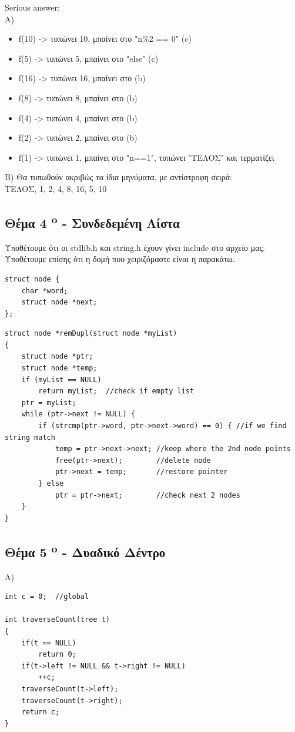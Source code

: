 \documentclass[a4paper,10pt]{article}
\begin{document}
Serious answer:\\
A)
\begin{itemize}
    \item f(10) -> τυπώνει 10, μπαίνει στο "n\%2 == 0" (c)
    \item f(5)  -> τυπώνει 5,  μπαίνει στο "else" (c)
    \item f(16) -> τυπώνει 16,  μπαίνει στο (b)
    \item f(8)  -> τυπώνει 8,  μπαίνει στο (b)
    \item f(4)  -> τυπώνει 4,  μπαίνει στο (b)
    \item f(2)  -> τυπώνει 2,  μπαίνει στο (b)
    \item f(1)  -> τυπώνει 1,  μπαίνει στο "n==1", τυπώνει "ΤΕΛΟΣ" και τερματίζει
\end{itemize}

B) Θα τυπωθούν ακριβώς τα ίδια μηνύματα, με αντίστροφη σειρά:\\
ΤΕΛΟΣ, 1, 2, 4, 8, 16, 5, 10

\subsection{Θέμα 4 \textsuperscript{o} - Συνδεδεμένη Λίστα}

Υποθέτουμε ότι οι stdlib.h και string.h έχουν γίνει include στο αρχείο μας.\\
Υποθέτουμε επίσης ότι η δομή που χειριζόμαστε είναι η παρακάτω.

\begin{verbatim}
struct node {
    char *word;
    struct node *next;
};
\end{verbatim}

\begin{verbatim}
struct node *remDupl(struct node *myList)
{
    struct node *ptr;
    struct node *temp;
    if (myList == NULL)
        return myList;  //check if empty list
    ptr = myList;
    while (ptr->next != NULL) {
        if (strcmp(ptr->word, ptr->next->word) == 0) { //if we find string match
            temp = ptr->next->next; //keep where the 2nd node points
            free(ptr->next);        //delete node
            ptr->next = temp;       //restore pointer
        } else
            ptr = ptr->next;        //check next 2 nodes
    }
}
\end{verbatim}

\subsection{Θέμα 5 \textsuperscript{o} - Δυαδικό Δέντρο}
A)\\
\begin{verbatim}
int c = 0;  //global

int traverseCount(tree t)
{
    if(t == NULL)
        return 0;
    if(t->left != NULL && t->right != NULL)
        ++c;
    traverseCount(t->left);
    traverseCount(t->right);
    return c;
}
\end{verbatim}
\end{document}
